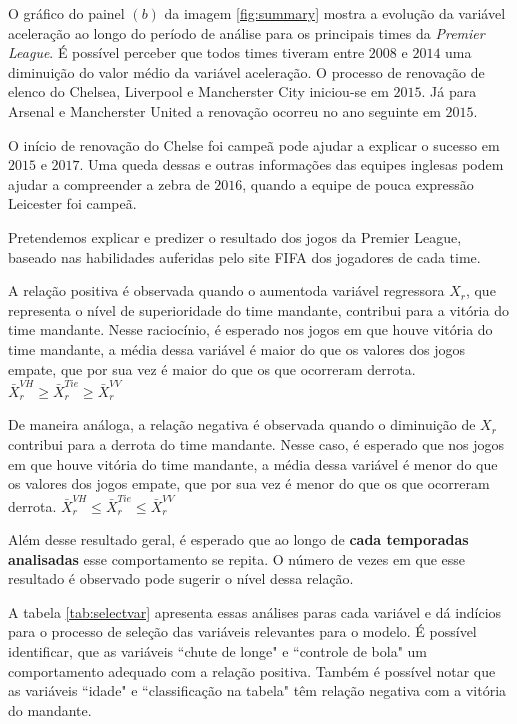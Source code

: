 \documentclass[review]{elsarticle}
\begin{document}
O gráfico do painel $(b)$ da imagem \ref{fig:summary} mostra a evolução da variável aceleração ao longo do período de análise para os principais times da \textit{Premier League}. É possível perceber que todos times tiveram entre $2008$ e $2014$ uma diminuição do valor médio da variável aceleração. O processo de renovação de elenco do Chelsea, Liverpool e Mancherster City iniciou-se em $2015$. Já para Arsenal e Mancherster United a renovação ocorreu no ano seguinte em $2015$.

O início de renovação do Chelse foi campeã pode ajudar a explicar o sucesso em $2015$ e $2017$. Uma queda dessas e outras informações das equipes inglesas podem ajudar a compreender a zebra de $2016$, quando a equipe de pouca expressão Leicester foi campeã. 

Pretendemos explicar e predizer o resultado dos jogos da Premier League, baseado nas habilidades auferidas pelo site FIFA dos jogadores de cada time.


A relação positiva é observada quando o aumentoda  variável regressora $X_r$, que representa o nível de superioridade do time mandante, contribui para a vitória do time mandante. Nesse raciocínio, é esperado nos jogos em que houve vitória do time mandante, a média dessa variável é maior do que os valores dos jogos empate, que por sua vez é maior do que os que ocorreram derrota. $\bar{X}_r^{VH}\geq \bar{X}_r^{Tie} \geq \bar{X}_r^{VV}$

 De maneira análoga, a relação negativa é observada quando o diminuição de $X_r$ contribui para a derrota do time mandante. Nesse caso, é esperado que nos jogos em que houve vitória do time mandante, a média dessa variável é menor do que os valores dos jogos empate, que por sua vez é menor do que os que ocorreram derrota. $\bar{X}_r^{VH} \leq \bar{X}_r^{Tie} \leq \bar{X}_r^{VV}$

Além desse resultado geral, é esperado que ao longo de \textbf{cada temporadas analisadas} esse comportamento se repita. O número de vezes em que esse resultado é observado pode sugerir o nível dessa relação.


A tabela \ref{tab:selectvar} apresenta essas análises paras cada variável e dá indícios para o processo de seleção das variáveis relevantes para o modelo. É possível identificar, que as variáveis ``chute de longe" e ``controle de bola" um comportamento adequado com a relação positiva. Também é possível notar que as variáveis ``idade" e ``classificação na tabela" têm relação negativa com a vitória do mandante.
\end{document}

